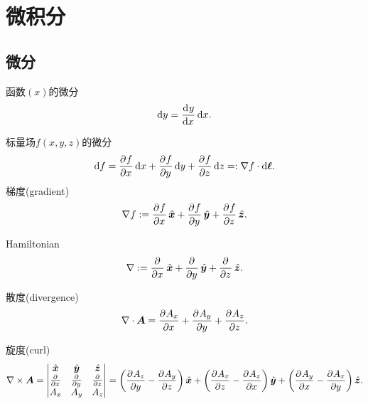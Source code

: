 \section{微积分}
\label{sec:calculus}

\subsection{微分}
\label{ssec:differential calculus}

\begin{compactitem}
	\item 函数$(x)$的微分
    \[
        \d y=\dv yx\d x.
    \]
	\item 标量场$f(x,y,z)$的微分
    \begin{align}
        \d f=\pv fx\d x+\pv fy\d y+\pv fz\d z=:\nabla f\cdot\d\bm\ell.
    \end{align}
    梯度(gradient)
    \begin{align}
        \nabla f:=\pv fx\uvec x+\pv fy\uvec y+\pv fz\uvec z.
    \end{align}
	\item Hamiltonian
	\begin{align}
        \nabla:=\pp x\uvec x+\pp y\uvec y+\pp z\uvec z.
    \end{align}
    \item 散度(divergence)
    \begin{align}
        \div\bm A=\pv{A_x}x+\pv{A_y}y+\pv{A_z}z.
    \end{align}
    \item 旋度(curl)
    \begin{equation}
        \curl\bm A=\begin{vmatrix}
            \uvec x&\uvec y&\uvec z\\
            \pp x&\pp y&\pp z\\
            A_x&A_y&A_z
        \end{vmatrix}=\biggkh{\pv{A_z}y-\pv{A_y}z}\uvec x+\biggkh{\pv{A_x}z-\pv{A_z}x}\uvec y+\biggkh{\pv{A_y}x-\pv{A_x}y}\uvec z.
    \end{equation}
\end{compactitem}
